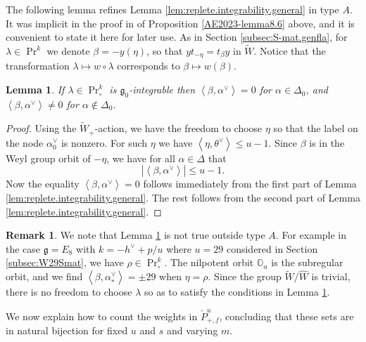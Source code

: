 \documentclass[12pt]{amsart}
\theoremstyle{plain}
\newtheorem{lemma}[thm]{Lemma}
\theoremstyle{definition}
\newtheorem{rem}[thm]{Remark}
\numberwithin{equation}{section}
\newcommand{\al}{\alpha}
\newcommand{\la}{\lambda}
\newcommand{\D}{\Delta}
\newcommand{\g}{\mathfrak{g}}
\newcommand{\wtil}[1]{\widetilde#1}
\newcommand{\what}[1]{\widehat#1}
\newcommand{\mbo}{\mathbb{O}}
\DeclareMathOperator{\prin}{Pr}
\begin{document}
The following lemma refines Lemma \ref{lem:replete.integrability.general} in type $A$. It was implicit in the proof in \cite{AE2023} of Proposition \ref{AE2023-lemma8.6} above, and it is convenient to state it here for later use. As in Section \ref{subsec:S-mat.genfla}, for $\la \in \prin^k$ we denote $\beta = -y(\eta)$, so that $yt_{-\eta} = t_{\beta}y$ in $\wtil{W}$. Notice that the transformation $\la \mapsto w \circ \la$ corresponds to $\beta \mapsto w(\beta)$. %
\begin{lemma}\label{lem:replete.integrability.type.A}
If $\la \in \prin^k_\circ$ is $\g_0$-integrable then $\left<\beta, \al^\vee \right> = 0$ for $\al \in \D_0$, and $\left<\beta, \al^\vee \right> \neq 0$ for $\al \notin \D_0$.
\end{lemma}

\begin{proof}
Using the $\wtil{W}_+$-action, we have the freedom to choose $\eta$ so that the label on the node $\al_0^\vee$ is nonzero. For such $\eta$ we have $\left<\eta, \theta^\vee\right> \leq u-1$. Since $\beta$ is in the Weyl group orbit of $-\eta$, we have for all $\al \in \D$ that
\[
| \left<\beta, \al^\vee\right> | \leq u-1.
\]
Now the equality $\left<\beta, \al^\vee \right> = 0$ follows immediately from the first part of Lemma \ref{lem:replete.integrability.general}. The rest follows from the second part of Lemma \ref{lem:replete.integrability.general}.
\end{proof}

\begin{rem}
We note that Lemma \ref{lem:replete.integrability.type.A} is not true outside type $A$. For example in the case $\g = E_8$ with $k = -h^\vee + p/u$ where $u = 29$ considered in Section \ref{subsec:W29Smat}, we have $\rho \in \prin_\circ^k$. The nilpotent orbit $\mbo_u$ is the subregular orbit, and we find $\left<\beta, \al_*^\vee\right> = \pm 29$ when $\eta = \rho$. Since the group $\wtil{W}/\what{W}$ is trivial, there is no freedom to choose $\la$ so as to satisfy the conditions in Lemma \ref{lem:replete.integrability.type.A}.
\end{rem}


We now explain how to count the weights in $\check{P}_{+, f}^u$, concluding that these sets are in natural bijection for fixed $u$ and $s$ and varying $m$.%
\end{document}
